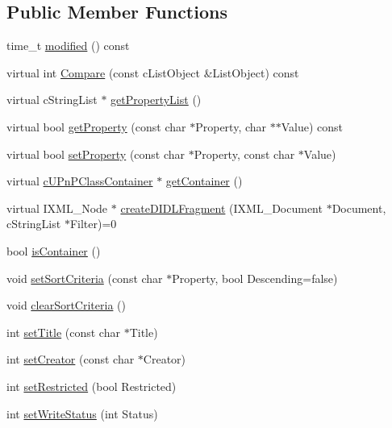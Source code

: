 \subsection*{Public Member Functions}
\begin{CompactItemize}
\item 
time\_\-t \hyperlink{classcUPnPClassObject_18c91d90256db85d1356db17b27f69c3}{modified} () const 
\item 
virtual int \hyperlink{classcUPnPClassObject_7297d228db4033bf8968eaee502131dd}{Compare} (const cListObject \&ListObject) const 
\item 
virtual cStringList $\ast$ \hyperlink{classcUPnPClassObject_4a4d2cd2e59d364050bb64a3d9dced6e}{getPropertyList} ()
\item 
virtual bool \hyperlink{classcUPnPClassObject_539cf36abc96b95bc8437601fed8a0f6}{getProperty} (const char $\ast$Property, char $\ast$$\ast$Value) const 
\item 
virtual bool \hyperlink{classcUPnPClassObject_6f2a803a0d0e148133edce23ed6c0e7c}{setProperty} (const char $\ast$Property, const char $\ast$Value)
\item 
virtual \hyperlink{classcUPnPClassContainer}{cUPnPClassContainer} $\ast$ \hyperlink{classcUPnPClassObject_ce6f39a8484ae48ea9801b11046cd2a6}{getContainer} ()
\item 
virtual IXML\_\-Node $\ast$ \hyperlink{classcUPnPClassObject_9090f5982129bc5aa15c6e19db627445}{createDIDLFragment} (IXML\_\-Document $\ast$Document, cStringList $\ast$Filter)=0
\item 
bool \hyperlink{classcUPnPClassObject_44f963ff6d731daca5b163ddbb1cf50f}{isContainer} ()
\item 
void \hyperlink{classcUPnPClassObject_6bf77953db1fd098a0ec5bc8795e6c6b}{setSortCriteria} (const char $\ast$Property, bool Descending=false)
\item 
void \hyperlink{classcUPnPClassObject_19295252a40ad5fd1a4870a473ac90ea}{clearSortCriteria} ()
\item 
int \hyperlink{classcUPnPClassObject_717c3efc5b21fc0c92ef19f1925b24c5}{setTitle} (const char $\ast$Title)
\item 
int \hyperlink{classcUPnPClassObject_b59e3528eda8c223f5336bd8a7d47527}{setCreator} (const char $\ast$Creator)
\item 
int \hyperlink{classcUPnPClassObject_40819ea39a75fc93e8c8a2ffde43732d}{setRestricted} (bool Restricted)
\item 
int \hyperlink{classcUPnPClassObject_4731b6c591544342da067f5abef5b661}{setWriteStatus} (int Status)
$$
\end{CompactItemize}

